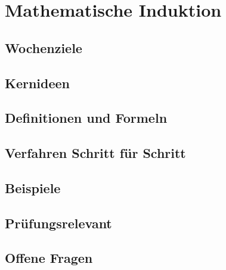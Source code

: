 \chapter{Mathematische Induktion}
\label{kap:07-induktion}

\section*{Wochenziele}
\begin{wochenziele}
\end{wochenziele}

\section{Kernideen}

\section{Definitionen und Formeln}

\section{Verfahren Schritt für Schritt}

\section{Beispiele}

\section{Prüfungsrelevant}

\section{Offene Fragen}
